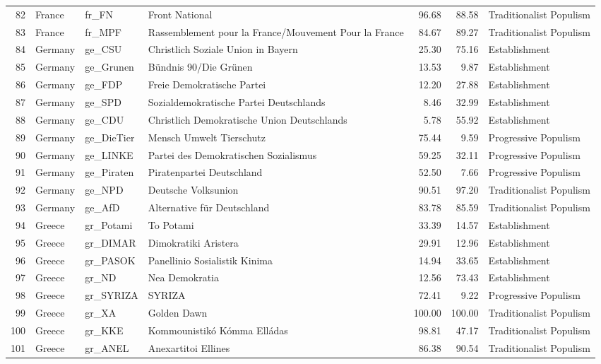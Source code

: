 \begin{longtable}[c]{@{\extracolsep{\fill}}rlllrrl}
		82 & France & fr\_FN & Front National & 96.68 & 88.58 & Traditionalist Populism \\
		83 & France & fr\_MPF & Rassemblement pour la France/Mouvement Pour la France & 84.67 & 89.27 & Traditionalist Populism \\
		84 & Germany & ge\_CSU & Christlich Soziale Union in Bayern & 25.30 & 75.16 & Establishment \\
		85 & Germany & ge\_Grunen & Bündnis 90/Die Grünen & 13.53 & 9.87 & Establishment \\
		86 & Germany & ge\_FDP & Freie Demokratische Partei & 12.20 & 27.88 & Establishment \\
		87 & Germany & ge\_SPD & Sozialdemokratische Partei Deutschlands & 8.46 & 32.99 & Establishment \\
		88 & Germany & ge\_CDU & Christlich Demokratische Union Deutschlands & 5.78 & 55.92 & Establishment \\
		89 & Germany & ge\_DieTier & Mensch Umwelt Tierschutz & 75.44 & 9.59 & Progressive Populism \\
		90 & Germany & ge\_LINKE & Partei des Demokratischen Sozialismus & 59.25 & 32.11 & Progressive Populism \\
		91 & Germany & ge\_Piraten & Piratenpartei Deutschland & 52.50 & 7.66 & Progressive Populism \\
		92 & Germany & ge\_NPD & Deutsche Volksunion & 90.51 & 97.20 & Traditionalist Populism \\
		93 & Germany & ge\_AfD & Alternative für Deutschland & 83.78 & 85.59 & Traditionalist Populism \\
		94 & Greece & gr\_Potami & To Potami & 33.39 & 14.57 & Establishment \\
		95 & Greece & gr\_DIMAR & Dimokratiki Aristera & 29.91 & 12.96 & Establishment \\
		96 & Greece & gr\_PASOK & Panellinio Sosialistik Kinima & 14.94 & 33.65 & Establishment \\
		97 & Greece & gr\_ND & Nea Demokratia & 12.56 & 73.43 & Establishment \\
		98 & Greece & gr\_SYRIZA & SYRIZA & 72.41 & 9.22 & Progressive Populism \\
		99 & Greece & gr\_XA & Golden Dawn & 100.00 & 100.00 & Traditionalist Populism \\
		100 & Greece & gr\_KKE & Kommounistikó Kómma Elládas & 98.81 & 47.17 & Traditionalist Populism \\
		101 & Greece & gr\_ANEL & Anexartitoi Ellines & 86.38 & 90.54 & Traditionalist Populism \\

\end{longtable}

